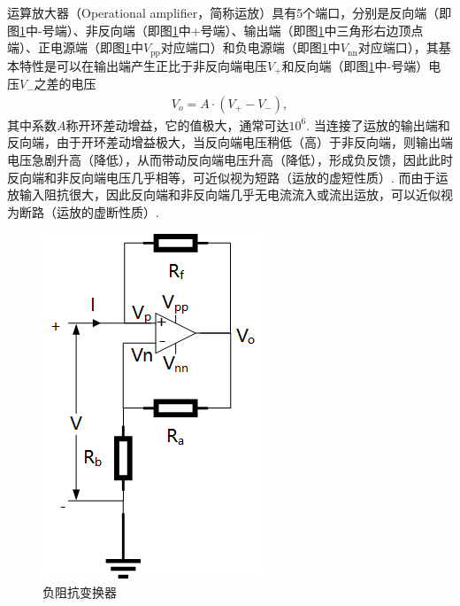 \documentclass{assignment}
\begin{document}
运算放大器（Operational amplifier，简称运放）具有5个端口，分别是反向端（即图\ref{NIC}中-号端）、非反向端（即图\ref{NIC}中+号端）、输出端（即图\ref{NIC}中三角形右边顶点端）、正电源端（即图\ref{NIC}中$V_{\text{pp}}$对应端口）和负电源端（即图\ref{NIC}中$V_{\text{nn}}$对应端口），其基本特性是可以在输出端产生正比于非反向端电压$V_+$和反向端（即图\ref{NIC}中-号端）电压$V_-$之差的电压
\begin{align}
    V_o=A\cdot(V_+-V_-),
\end{align}
其中系数$A$称开环差动增益，它的值极大，通常可达$10^6$. 当连接了运放的输出端和反向端，由于开环差动增益极大，当反向端电压稍低（高）于非反向端，则输出端电压急剧升高（降低），从而带动反向端电压升高（降低），形成负反馈，因此此时反向端和非反向端电压几乎相等，可近似视为短路（运放的虚短性质）. 而由于运放输入阻抗很大，因此反向端和非反向端几乎无电流流入或流出运放，可以近似视为断路（运放的虚断性质）.

\begin{figure}[h]
    \centering
    \includegraphics[width=.5\columnwidth]{NegativeImpedanceConverter.png}
    \caption{负阻抗变换器}
    \label{NIC}
\end{figure}
\end{document}
